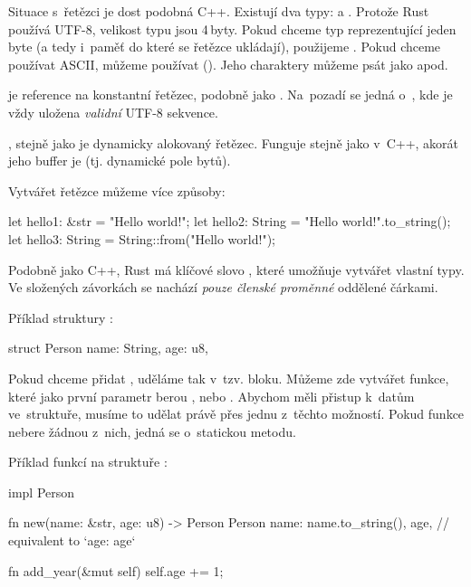 \documentclass[main.tex]{subfiles}
\begin{document}
Situace s~řetězci je dost podobná C++. Existují dva typy:  a .
Protože Rust používá UTF-8, velikost typu  jsou 4\,byty. Pokud chceme typ
reprezentující jeden byte (a tedy i~paměť do které se řetězce ukládají), použijeme
. Pokud chceme používat ASCII, můžeme používat  ().
Jeho charaktery můžeme psát jako  apod.

 je reference na konstantní řetězec, podobně jako .
Na~pozadí se jedná o~\irust{&[u8]}, kde je vždy uložena \emph{validní} UTF-8 sekvence.

, stejně jako  je dynamicky alokovaný řetězec. Funguje
stejně jako v~C++, akorát jeho buffer je  (tj. dynamické pole bytů).

Vytvářet řetězce můžeme více způsoby:

\obrazek
\begin{rustcode}
    let hello1: &str = "Hello world!";
    let hello2: String = "Hello world!".to_string();
    let hello3: String = String::from("Hello world!");
\end{rustcode}


Podobně jako C++, Rust má klíčové slovo , které umožňuje vytvářet vlastní
typy. Ve složených závorkách se nachází \emph{pouze členské proměnné} oddělené čárkami.

Příklad struktury :

\obrazek
\begin{rustcode}
    struct Person {
        name: String,
        age: u8,
    }
\end{rustcode}

Pokud chceme přidat , uděláme tak v~tzv.  bloku. Můžeme zde
vytvářet funkce, které jako první parametr berou ,  nebo
. Abychom měli přistup k~datům ve~struktuře, musíme to udělat právě přes
jednu z~těchto možností. Pokud funkce nebere žádnou z~nich, jedná se o~statickou metodu.

Příklad funkcí na struktuře :

\obrazek
\begin{rustcode}
    impl Person {
        fn new(name: &str, age: u8) -> Person {
            Person {
                name: name.to_string(),
                age, // equivalent to `age: age`
            }
        }

        fn add_year(&mut self) {
            self.age += 1;
        }
    }
\end{rustcode}
\end{document}
